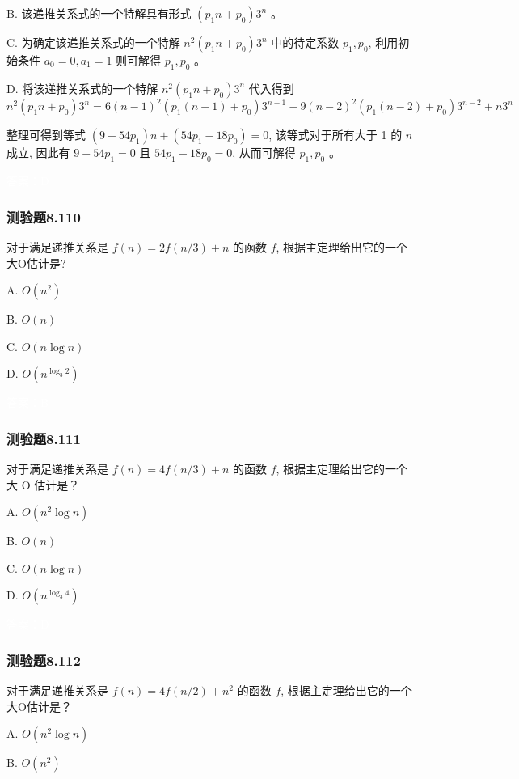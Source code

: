 \documentclass[UTF8, heading=true]{ctexart}
\begin{document}
B. 该递推关系式的一个特解具有形式 $\left(p_1 n+p_0\right) 3^n$ 。

C. 为确定该递推关系式的一个特解 $n^2\left(p_1 n+p_0\right) 3^n$ 中的待定系数 $p_1, p_0$, 利用初始条件 $a_0=0, a_1=1$ 则可解得 $p_1, p_0$ 。

D. 将该递推关系式的一个特解 $n^2\left(p_1 n+p_0\right) 3^n$ 代入得到
$$
n^2\left(p_1 n+p_0\right) 3^n=6(n-1)^2\left(p_1(n-1)+p_0\right) 3^{n-1}-9(n-2)^2\left(p_1(n-2)+p_0\right) 3^{n-2}+n 3^n
$$

整理可得到等式 $\left(9-54 p_1\right) n+\left(54 p_1-18 p_0\right)=0$, 该等式对于所有大于 1 的 $n$ 成立, 因此有 $9-54 p_1=0$ 且 $54 p_1-18 p_0=0$, 从而可解得 $p_1, p_0$ 。


\textcolor{white}{答案：D}

\subsubsection{测验题8.110}

对于满足递推关系是 $f(n)=2 f(n / 3)+n$ 的函数 $f$, 根据主定理给出它的一个大O估计是?

A. $O\left(n^2\right)$

B. $O(n)$

C. $O(n \log n)$

D. $O\left(n^{\log _3 2}\right)$

\textcolor{white}{答案：B}

\subsubsection{测验题8.111}

对于满足递推关系是 $f(n)=4 f(n / 3)+n$ 的函数 $f$, 根据主定理给出它的一个大 O 估计是？

A. $O\left(n^2 \log n\right)$

B. $O(n)$

C. $O(n \log n)$

D. $O\left(n^{\log _3 4}\right)$

\textcolor{white}{答案：D}

\subsubsection{测验题8.112}

对于满足递推关系是 $f(n)=4 f(n / 2)+n^2$ 的函数 $f$, 根据主定理给出它的一个大O估计是？

A. $O\left(n^2 \log n\right)$

B. $O\left(n^2\right)$
\end{document}

